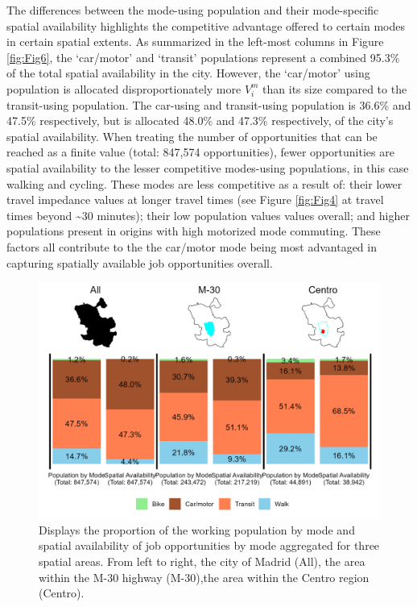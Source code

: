 \documentclass[10pt,letterpaper]{article}
\begin{document}
The differences between the mode-using population and their
mode-specific spatial availability highlights the competitive advantage
offered to certain modes in certain spatial extents. As summarized in
the left-most columns in Figure \ref{fig:Fig6}, the `car/motor' and
`transit' populations represent a combined 95.3\% of the total spatial
availability in the city. However, the `car/motor' using population is
allocated disproportionately more \(V_i^m\) than its size compared to
the transit-using population. The car-using and transit-using population
is 36.6\% and 47.5\% respectively, but is allocated 48.0\% and 47.3\%
respectively, of the city's spatial availability. When treating the
number of opportunities that can be reached as a finite value (total:
847,574 opportunities), fewer opportunities are spatial availability to
the lesser competitive modes-using populations, in this case walking and
cycling. These modes are less competitive as a result of: their lower
travel impedance values at longer travel times (see Figure
\ref{fig:Fig4} at travel times beyond \textasciitilde30 minutes); their
low population values values overall; and higher populations present in
origins with high motorized mode commuting. These factors all contribute
to the the car/motor mode being most advantaged in capturing spatially
available job opportunities overall.

\begin{figure}

{\centering \includegraphics[width=1\linewidth]{images/modal_V_comps_4plot} 

}

\caption{\label{fig:Fig6} Displays the proportion of the working population by mode and spatial availability of job opportunities by mode aggregated for three spatial areas. From left to right, the city of Madrid (All), the area within the M-30 highway (M-30),the area within the Centro region (Centro).}\label{fig:modal-V-comps-plot}
\end{figure}
\end{document}

